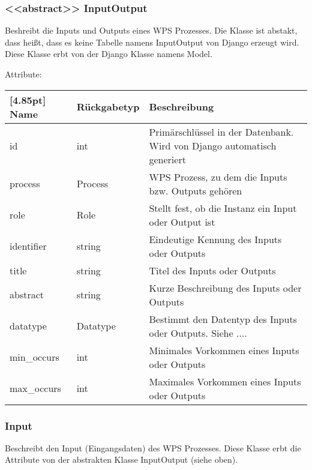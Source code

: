		\subsubsection{<<abstract>> InputOutput}
			Beshreibt die Inputs und Outputs eines WPS Prozesses. Die Klasse ist abstakt, dass heißt, dass es keine Tabelle namens InputOutput von Django erzeugt wird. \newline
			Diese Klasse erbt von der Django Klasse namens \glqq Model\grqq .
			
			Attribute:
			\begin{center}
				\setlength\tabcolsep{5pt}
				\renewcommand{\arraystretch}{1.5}
				
				\begin{tabularx}{\textwidth}{|l|l|X|}
					\hline
					\rowcolor[gray]{0.75}[4.85pt]
					Name & Rückgabetyp & Beschreibung \\ \hline 
					id & int & Primärschlüssel in der Datenbank. Wird von Django automatisch generiert \\ \hline
					process & Process & WPS Prozess, zu dem die Inputs bzw. Outputs gehören \\ \hline
					role & Role & Stellt fest, ob die Instanz ein Input oder Output ist \\ \hline
					identifier & string & Eindeutige Kennung des Inputs oder Outputs \\ \hline
					title & string & Titel des Inputs oder Outputs \\ \hline
					abstract & string & Kurze Beschreibung des Inputs oder Outputs \\ \hline
					datatype & Datatype & Bestimmt den Datentyp des Inputs oder Outputs. 
					Siehe .... \\ \hline
					min\_occurs & int & Minimales Vorkommen eines Inputs oder Outputs \\ \hline
					max\_occurs & int & Maximales Vorkommen eines Inputs oder Outputs \\ \hline
				\end{tabularx}
			\end{center}
			
    	\subsubsection{Input}
			Beschreibt den Input (Eingangsdaten) des WPS Prozesses. \newline
			Diese Klasse erbt die Attribute von der abstrakten Klasse InputOutput (siehe oben).

